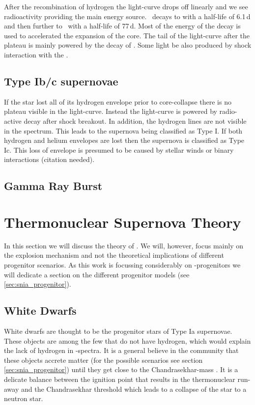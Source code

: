 After the recombination of hydrogen the light-curve drops off linearly and we see radioactivity providing the main energy source. \Ni\ decays to \cofiftysix with a half-life of 6.1\,d and then further to \fefiftysix\ with a half-life of 77\,d. Most of the energy of the \Ni decay is used to accelerated the expansion of the core. The tail of the light-curve after the plateau is mainly powered by the decay of \cofiftysix. Some light be also produced by shock interaction with the \csm.

\subsection{Type Ib/c supernovae}
If the star lost all of its hydrogen envelope prior to core-collapse there is no plateau visible in the light-curve. Instead the light-curve is powered by radio-active decay after shock breakout. In addition, the hydrogen lines are not visible in the spectrum. This leads to the supernova being classified as Type I. If both hydrogen and helium envelopes are lost then the supernova is classified as Type Ic. 
This loss of envelope is presumed to be caused by stellar winds or binary interactions (citation needed). 


\subsection{Gamma Ray Burst}



\section{Thermonuclear Supernova Theory}
In this section we will discuss the theory of \sneia. We will, however, focus mainly on the explosion mechanism and not the theoretical implications of different progenitor scenarios. As this work is focussing considerably on \snia-progenitors we will dedicate a section on the different progenitor models (see \ref{sec:snia_progenitor}).

\subsection{White Dwarfs}
White dwarfs are thought to be the progenitor stars of Type Ia supernovae. These objects are among the few that do not have hydrogen, which would explain the lack of hydrogen in \snia-spectra. It is a general believe in the community that these objects accrete matter (for the possible scenarios see section \ref{sec:snia_progenitor}) until they get close to the Chandrasekhar-mass \citep{1931ApJ....74...81C}. It is a delicate balance between the ignition point that results in the thermonuclear run-away and the Chandrasekhar threshold which leads to a collapse of the star to a neutron star.
 
